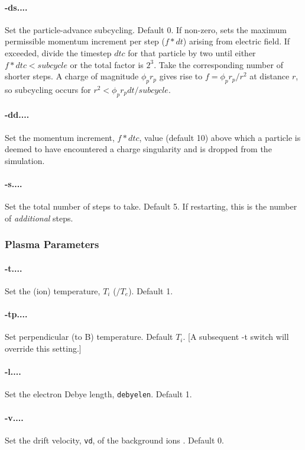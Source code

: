 \documentclass[12pt]{article}
\begin{document}
\paragraph{-ds....}
Set the particle-advance subcycling. Default 0.  If non-zero, sets the
maximum permissible momentum increment per step ($f*dt$) arising from
electric field. If exceeded, divide the timestep $dtc$ for that
particle by two until either $f*dtc<subcycle$ or the total factor is
$2^3$. Take the corresponding number of shorter steps. A charge of
magnitude $\phi_pr_p$ gives rise to $f=\phi_pr_p/r^2$ at distance $r$,
so subcycling occurs for $r^2<\phi_pr_pdt/subcycle$.

\paragraph{-dd....}
Set the momentum increment, $f*dtc$, value (default 10) above which a
particle is deemed to have encountered a charge singularity and is
dropped from the simulation.

\paragraph{-s....}
Set the total number of steps to take. Default 5. 
If restarting, this is the number of \emph{additional} steps. 

\subsubsection*{Plasma Parameters}

\paragraph{-t....}  Set the (ion) temperature, $T_i$ ($/T_e$). Default 1.

\paragraph{-tp....} Set perpendicular (to B) temperature. Default
$T_i$. [A subsequent -t switch will override this setting.]

\paragraph{-l....}  Set the electron Debye length, \verb!debyelen!. Default 1.

\paragraph{-v....}  Set the drift velocity, \verb!vd!, of the background ions . Default 0.
\end{document}
